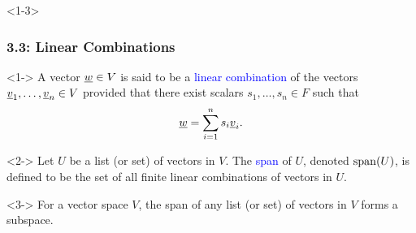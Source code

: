 \documentclass[10pt,english,aspectratio=169]{beamer}
\begin{document}
\begin{frame}<1-3> \frametitle{3.3: Linear Combinations}

\begin{definition}<1->
A vector $\underline{w} \in V$ is said to be a \textcolor{blue}{linear combination} of the vectors $\underline{v}_1, \ldots, \underline{v}_n \in V$ provided that there exist scalars $s_1, \ldots, s_n \in F$ such that
\begin{equation*}
\underline{w} = \sum_{i=1}^n s_i \underline{v}_i.
\end{equation*}
\end{definition}

\begin{definition}<2->
Let $U$ be a list (or set) of vectors in $V$.
The \textcolor{blue}{span} of $U$, denoted $\mathrm{span}(U)$, is defined to be the set of all finite linear combinations of vectors in $U$.
\end{definition}

\begin{example}<3->
For a vector space $V$, the span of any list (or set) of vectors in $V$ forms a subspace.
\end{example}


\end{frame}
\end{document}
